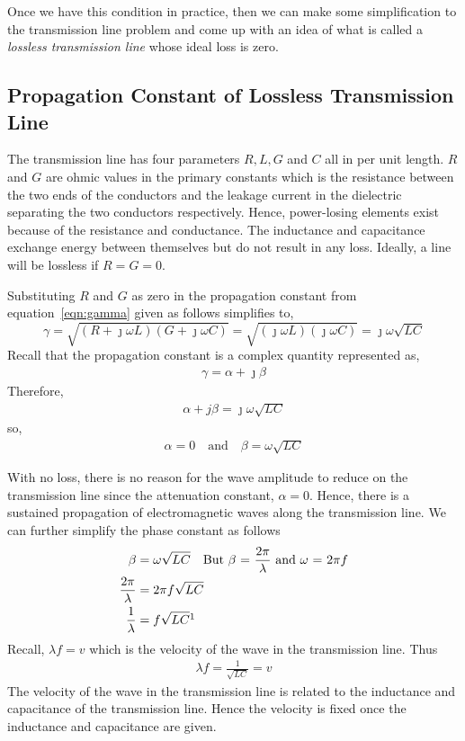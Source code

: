 Once we have this condition in practice, then we can make some simplification to the transmission line problem and come up with an idea of what is called a \emph{lossless transmission line} whose ideal loss is zero.

\subsection{Propagation Constant of Lossless Transmission Line}
The transmission line has four parameters $R, L, G$ and $C$ all in per unit length. $R$ and $G$ are ohmic values in the primary constants which is the resistance between the two ends of the conductors and the leakage current in the dielectric separating the two conductors respectively. Hence, power-losing elements exist because of the resistance and conductance. The inductance and capacitance exchange energy between themselves but do not result in any loss. Ideally, a line will be lossless if $R = G = 0$.

Substituting $R$ and $G$ as zero in the propagation constant from equation~\eqref{eqn:gamma} given as follows simplifies to,
\begin{dmath*}
\gamma = \sqrt{(R + \jmath\omega L)(G + \jmath\omega C)}
= \sqrt{(\jmath\omega L)(\jmath\omega C)}
= \jmath\omega\sqrt{LC}
\end{dmath*}
Recall that the propagation constant is a complex quantity represented as,
\begin{align*}
\gamma = \alpha + \jmath\beta
\end{align*} 
Therefore,
\begin{align*}
\alpha + j\beta = \jmath\omega\sqrt{LC}
\end{align*}
so,
\begin{align*}
\alpha = 0\quad\text{and}\quad\beta = \omega\sqrt{LC}
\end{align*}

With no loss, there is no reason for the wave amplitude to reduce on the transmission line since the attenuation constant, $\alpha = 0$. Hence, there is a sustained propagation of electromagnetic waves along the transmission line. We can further simplify the phase constant as follows
\begin{align*}
\beta &= \omega\sqrt{LC}\quad\text{But }\beta\text{ = }\frac{2\pi}{\lambda}\text{ and }\omega\text{ = }2\pi f\\
\frac{2\pi}{\lambda} &= 2\pi f\sqrt{LC}\\
\frac{1}{\lambda} &= f\sqrt{LC}\footnotemark
\end{align*}
Recall, $\lambda f = v$ which is the velocity of the wave in the transmission line. Thus
\begin{align*}
\lambda f = \frac{1}{\sqrt{LC}} = v
\end{align*}
The velocity of the wave in the transmission line is related to the inductance and capacitance of the transmission line. Hence the velocity is fixed once the inductance and capacitance are given.

